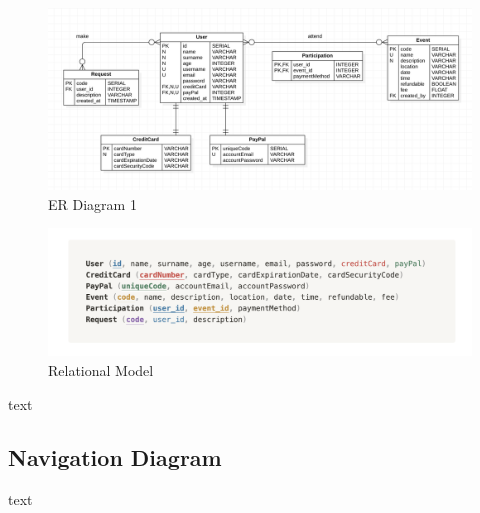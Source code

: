 \documentclass[11pt]{article}
\begin{document}
            \begin{figure}[H]
                \centering
                \includegraphics[width=\textwidth]{er_diagram/er_diagram_1}
                \caption{ER Diagram 1}
                \label{fig:er-diagram-1}
            \end{figure}

            \begin{figure}[H]
                \centering
                \includegraphics[width=\textwidth]{er_diagram/relational_model_1}
                \caption{Relational Model}
                \label{fig:relational-model}
            \end{figure}

            text

        \subsection{Navigation Diagram} \label{subsec:navigation-diagram}

            text
\end{document}
